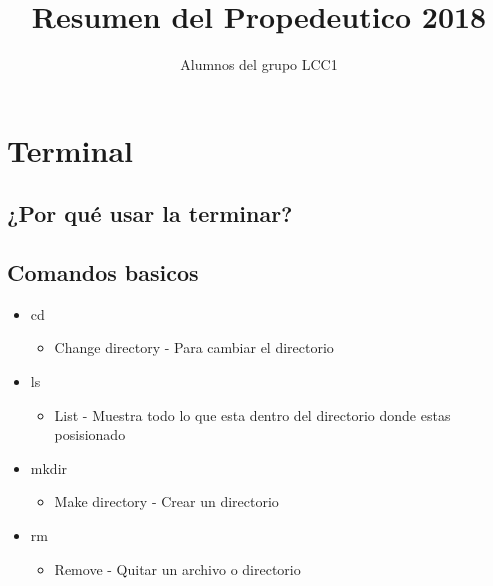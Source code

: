 \documentclass[11pt,letterpaper]{article}
\title{Resumen del Propedeutico 2018}
\author{Alumnos del grupo LCC1}
\begin{document}
\maketitle
\section{Terminal}
\subsection{¿Por qué usar la terminar?}


\subsection{Comandos basicos}
\begin{itemize}
\item cd
  \begin {itemize}
  \item Change directory - Para cambiar el directorio
    \end{itemize}
\item ls
  \begin{itemize}
  \item List - Muestra todo lo que esta dentro del directorio donde estas posisionado
  \end{itemize}
\item mkdir
  \begin{itemize}
  \item Make directory - Crear un directorio
  \end{itemize}
\item rm
  \begin{itemize}
  \item Remove - Quitar un archivo o directorio
  \end{itemize}
\end{itemize}



\end{document}
